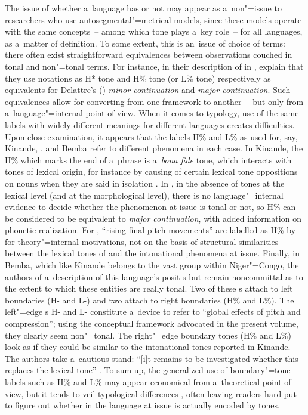 The issue of whether a~language has  or not may appear as a~non"=issue to
researchers who use autosegmental"=metrical models, since these models operate with the same
concepts~-- among which tone plays a~key role~-- for all languages, as a~matter of
definition. To some extent, this is an~issue of choice of terms: there often exist straightforward
equivalences between observations couched in tonal and non"=tonal terms. For instance, in their
description of  in , \citet[49–51]{fougeronetal1998} explain that they use notations
as H* tone and H\% tone (or L\% tone) respectively as equivalents for Delattre’s
(\citeyear{delattre1966a}) \textit{minor continuation} and \textit{major continuation}. Such equivalences allow for converting from one framework to another~-- but only from
a~language"=internal point of view. When it comes to typology, use of the same labels with
widely different meanings for different languages creates difficulties. Upon close examination, it
appears that the labels H\% and L\% as used for, say, Kinande, ,  and Bemba refer to different phenomena in each case. In Kinande, the H\% which marks the end of a~phrase is a~\textit{bona fide}
tone, which interacts with tones of lexical origin, for instance by causing  of certain lexical
tone oppositions on nouns when they are said in isolation \citep[558]{hyman2014}. In , in the
absence of tones at the lexical level (and at the morphological level), there is no language"=internal
evidence to decide whether the phenomenon at issue is tonal or not, so H\% can be considered to be
equivalent to \textit{major continuation}, with added information on phonetic realization. For
, “rising final pitch movements” are labelled as H\% by \citet{haetal2010} for theory"=internal motivations, not on the basis of structural similarities
between the lexical tones of  and the intonational phenomena at issue. Finally, in Bemba, which like Kinande belongs to the vast  group within Niger"=Congo, the authors of a~description of this language's  \citep{kula2016} posit s but remain noncommittal as to the extent to which these entities are really tonal. Two of these s attach to left boundaries (H- and L-) and two attach to right boundaries (H\% and L\%). The left"=edge s H- and L- constitute a~device to refer to “global effects of pitch  and compression”; using the conceptual framework advocated in the present volume, they clearly seem non"=tonal. The right"=edge boundary tones (\mbox{H\%} and L\%) look as if they could be similar to the intonational tones reported in Kinande. The authors take a~cautious stand: “[i]t remains to
be investigated whether this  replaces the lexical tone” \citep[331]{kula2016}. To sum up, the generalized use of boundary"=tone labels such as H\% and L\% may appear economical from a~theoretical point of view, but it tends to veil typological differences \citep{ladd2008}, often leaving readers hard put to figure out whether  in the language at issue is actually encoded by tones. 

